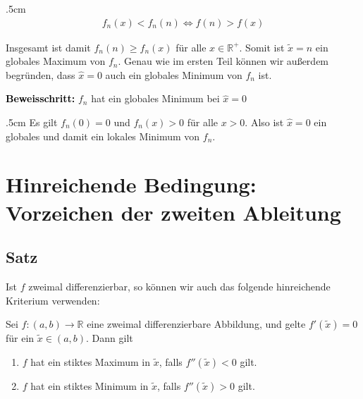 \documentclass[fontsize=9pt,
               parskip=half-,
               DIV=14,
               listof=chapterentry,
               tocflat]{scrbook}
\newenvironment{indentblock}{\begin{adjustwidth}{.5cm}{}}{\end{adjustwidth}}
\newcommand{\proofstep}[1]{\textbf{\textcolor{Black}{#1}}}
\begin{document}
\begin{solution*}
\begin{indentblock}
\begin{align*}
f_{n}(x)<f_{n}(n)\iff f(n)>f(x)
\end{align*}

Insgesamt ist damit $f_{n}(n)\geq f_{n}(x)$ für alle $x\in \mathbb {R} ^{+}$. Somit ist ${\tilde {x}}=n$ ein globales Maximum von $f_{n}$. Genau wie im ersten Teil können wir außerdem begründen, dass ${\hat {x}}=0$ auch ein globales Minimum von $f_{n}$ ist.

\end{indentblock}

\proofstep{Beweisschritt:}
 $f_{n}$ hat ein globales Minimum bei ${\hat {x}}=0$\begin{indentblock}
Es gilt $f_{n}(0)=0$ und $f_{n}(x)>0$ für alle $x>0$. Also ist ${\hat {x}}=0$ ein globales und damit ein lokales Minimum von $f_{n}$.

\end{indentblock}

\end{solution*}

\section{Hinreichende Bedingung: Vorzeichen der zweiten Ableitung}

\subsection{Satz}

Ist $f$ zweimal differenzierbar, so können wir auch das folgende hinreichende Kriterium verwenden:

\begin{theorem*}
Sei $f:(a,b)\to \mathbb {R} $ eine zweimal differenzierbare Abbildung, und gelte $f'({\tilde {x}})=0$ für ein ${\tilde {x}}\in (a,b)$. Dann gilt

\begin{enumerate}
\item $f$ hat ein stiktes Maximum in ${\tilde {x}}$, falls $f''({\tilde {x}})<0$ gilt.
\item $f$ hat ein stiktes Minimum in ${\tilde {x}}$, falls $f''({\tilde {x}})>0$ gilt.
\end{enumerate}

\end{theorem*}
\end{document}
